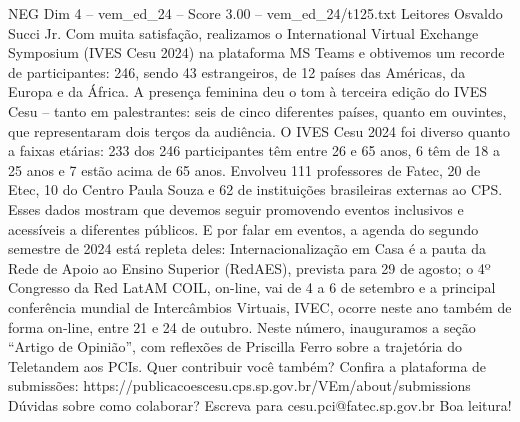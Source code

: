 \begin{textsample}{NEG Dim 4 – vem\_ed\_24 – Score 3.00 – vem\_ed\_24/t125.txt}  \label{ex:f4_neg_067}
Leitores Osvaldo Succi Jr.
Com muita satisfação, realizamos o International Virtual Exchange Symposium (IVES Cesu 2024) na plataforma MS Teams e obtivemos um recorde de participantes: 246, sendo 43 estrangeiros, de 12 países das Américas, da Europa e da África.
A presença feminina deu o tom à terceira edição do IVES Cesu – tanto em palestrantes: seis de cinco diferentes países, quanto em ouvintes, que representaram dois terços da audiência.
O IVES Cesu 2024 foi diverso quanto a faixas etárias: 233 dos 246 participantes têm entre 26 e 65 anos, 6 têm de 18 a 25 anos e 7 estão acima de 65 anos.
Envolveu 111 professores de Fatec, 20 de Etec, 10 do Centro Paula Souza e 62 de instituições brasileiras externas ao CPS.
Esses dados mostram que devemos seguir promovendo eventos inclusivos e acessíveis a diferentes públicos.
E por falar em eventos, a agenda do segundo semestre de 2024 está repleta deles: Internacionalização em Casa é a pauta da Rede de Apoio ao Ensino Superior (RedAES), prevista para 29 de agosto; o 4º Congresso da Red LatAM COIL, on-line, vai de 4 a 6 de setembro e a principal conferência mundial de Intercâmbios Virtuais, IVEC, ocorre neste ano também de forma on-line, entre 21 e 24 de outubro.
Neste número, inauguramos a seção “Artigo de Opinião”, com reflexões de Priscilla Ferro sobre a trajetória do Teletandem aos PCIs.
Quer contribuir você também?
Confira a plataforma de submissões: https://publicacoescesu.cps.sp.gov.br/VEm/about/submissions Dúvidas sobre como colaborar?
Escreva para cesu.pci@fatec.sp.gov.br Boa leitura!

\end{textsample}
